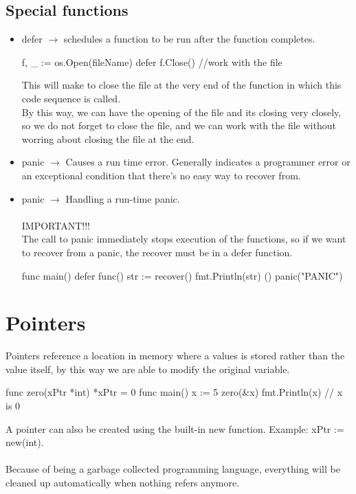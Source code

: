\documentclass[twoside,a4paper,english]{report}
\begin{document}
\section{Special functions}
\begin{itemize}
\item defer $\rightarrow$ schedules a function to be run after the function completes.
\begin{go}
f, _ := os.Open(fileName)
  defer f.Close()
  //work with the file
\end{go}
This will make to close the file at the very end of the function in which this code sequence is called. \\
By this way, we can have the opening of the file and its closing very closely, so we do not forget to close the file, and we can work with the file without worring about closing the file at the end.
\item panic $\rightarrow$ Causes a run time error. Generally indicates a programmer error or an exceptional condition that there's no easy way to recover from.
\item panic $\rightarrow$ Handling a run-time panic.\\\\
{\color{my_blue}IMPORTANT!!!}\\ 
The call to panic immediately stops execution of the functions, so if we want to recover from a panic, the recover must be in a defer function.
\begin{go}
func main() {
  defer func() {
    str := recover()
    fmt.Println(str)
  }()
  panic("PANIC")
}
\end{go}
\end{itemize}
\chapter{Pointers}
Pointers reference a location in memory where a values is stored rather than the value itself, by this way we are able to modify the original variable.
\begin{go}
func zero(xPtr *int) {
  *xPtr = 0
}
func main() {
  x := 5
  zero(&x)
  fmt.Println(x) // x is 0
}
\end{go}
\vspace{0.7cm}
A pointer can also be created using the built-in new function. Example: xPtr := new(int).\\\\

Because of being a garbage collected programming language, everything will be cleaned up automatically when nothing refers anymore.\\\\
\end{document}
